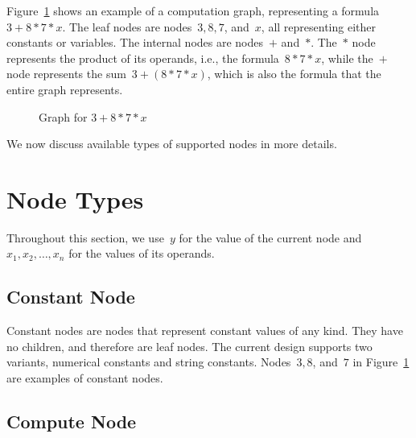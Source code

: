 \documentclass{article}
\begin{document}
Figure~\ref{fig:design:graph-example} shows an example of a computation graph, representing a formula~$3 + 8 * 7 * x$.
The leaf nodes are nodes~$3, 8, 7$, and~$x$, all representing either constants or variables.
The internal nodes are nodes~$+$ and~$*$.
The~$*$ node represents the product of its operands, i.e., the formula~$8 * 7 * x$, while the~$+$ node represents the sum~$3 + (8 * 7 * x)$, which is also the formula that the entire graph represents.
%
\begin{figure}
	\centering
	\caption{Graph for $3 + 8 * 7 * x$}
	\label{fig:design:graph-example}
\end{figure}

We now discuss available types of supported nodes in more details.

\section{Node Types}
\label{sec:nodeTypes}

Throughout this section, we use~$y$ for the value of the current node and~$x_1, x_2, \dots, x_n$ for the values of its operands.

\subsection{Constant Node}

Constant nodes are nodes that represent constant values of any kind.
They have no children, and therefore are leaf nodes.
The current design supports two variants, numerical constants and string constants.
Nodes~$3, 8$, and~$7$ in Figure~\ref{fig:design:graph-example} are examples of constant nodes.

\subsection{Compute Node}
\end{document}
